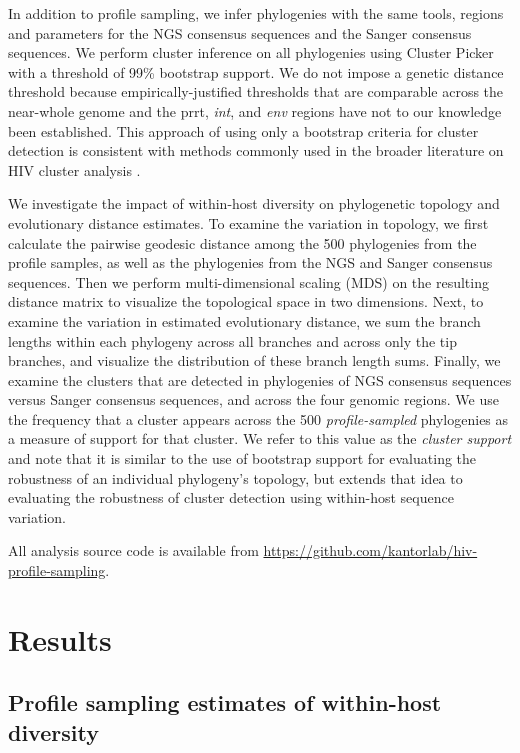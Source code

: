 \documentclass[letterpaper]{article}
\begin{document}
In addition to profile sampling, we infer phylogenies with the same tools, regions and parameters for the NGS consensus sequences and the Sanger consensus sequences. We perform cluster inference on all phylogenies using Cluster Picker \parencite{ragonnet-cronin} with a threshold of 99\% bootstrap support. We do not impose a genetic distance threshold because empirically-justified thresholds that are comparable across the near-whole genome and the prrt, \emph{int}, and \emph{env} regions have not to our knowledge been established. This approach of using only a bootstrap criteria for cluster detection is consistent with methods commonly used in the broader literature on HIV cluster analysis \parencite{hassan}. 

We investigate the impact of within-host diversity on phylogenetic topology and evolutionary distance estimates. To examine the variation in topology, we first calculate the pairwise geodesic distance \parencite{billera,owen} among the 500 phylogenies from the profile samples, as well as the phylogenies from the NGS and Sanger consensus sequences. Then we perform multi-dimensional scaling (MDS) on the resulting distance matrix to visualize the topological space in two dimensions. Next, to examine the variation in estimated evolutionary distance, we sum the branch lengths within each phylogeny across all branches and across only the tip branches, and visualize the distribution of these branch length sums. Finally, we examine the clusters that are detected in phylogenies of NGS consensus sequences versus Sanger consensus sequences, and across the four genomic regions. We use the frequency that a cluster appears across the 500 \emph{profile-sampled} phylogenies as a measure of support for that cluster. We refer to this value as the \emph{cluster support} and note that it is similar to the use of bootstrap support for evaluating the robustness of an individual phylogeny's topology, but extends that idea to evaluating the robustness of cluster detection using within-host sequence variation.

All analysis source code is available from \url{https://github.com/kantorlab/hiv-profile-sampling}.

\section*{Results}

\subsection*{Profile sampling estimates of within-host diversity}
\end{document}

